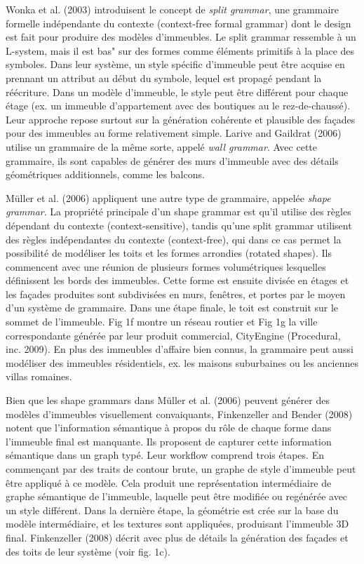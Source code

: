 \documentclass[11pt]{report}
\begin{document}
Wonka et al. (2003) introduisent le concept de \textit{split grammar}, une grammaire formelle indépendante du contexte (context-free formal grammar) dont le design est fait pour produire des modèles d'immeubles. Le split grammar ressemble à un L-system, mais il est bas" sur des formes comme éléments primitifs à la place des symboles. Dans leur système, un style spécific d'immeuble peut être acquise en prennant un attribut au début du symbole, lequel est propagé pendant la réécriture. Dans un modèle d'immeuble, le style peut être différent pour chaque étage (ex. un immeuble d'appartement avec des boutiques au le rez-de-chaussé). Leur approche repose surtout sur la génération cohérente et plausible des façades pour des immeubles au forme relativement simple. Larive and Gaildrat (2006) utilise un grammaire de la même sorte, appelé \textit{wall grammar}. Avec cette grammaire, ils sont capables de générer des murs d'immeuble avec des détails géométriques additionnels, comme les balcons. \newline

Müller et al. (2006) appliquent une autre type de grammaire, appelée \textit{shape grammar}. La propriété principale d'un shape grammar est qu'il utilise des règles dépendant du contexte (context-sensitive), tandis qu'une split grammar utilisent des règles indépendantes du contexte (context-free), qui dans ce cas permet la possibilité de modéliser les toits et les formes arrondies (rotated shapes). Ils commencent avec une réunion de plusieurs formes volumétriques lesquelles définissent les bords des immeubles. Cette forme est ensuite divisée en étages et les façades produites sont subdivisées en murs, fenêtres, et portes par le moyen d'un système de grammaire. Dans une étape finale, le toit est construit sur le sommet de l'immeuble. Fig 1f montre un réseau routier et Fig 1g la ville correspondante générée par leur produit commercial, CityEngine (Procedural, inc. 2009). En plus des immeubles d'affaire bien connus, la grammaire peut aussi modéliser des immeubles résidentiels, ex. les maisons suburbaines ou les anciennes villas romaines. \newline

Bien que les shape grammars dans Müller et al. (2006) peuvent générer des modèles d'immeubles visuellement convaiquants, Finkenzeller and Bender (2008) notent que l'information sémantique à propos du rôle de chaque forme dans l'immeuble final est manquante. Ils proposent de capturer cette information sémantique dans un graph typé. Leur workflow comprend trois étapes. En commençant par des traits de contour brute, un graphe de style d'immeuble peut être appliqué à ce modèle. Cela produit une représentation intermédiaire de graphe sémantique de l'immeuble, laquelle peut être modifiée ou regénérée avec un style différent. Dans la dernière étape, la géométrie est crée sur la base du modèle intermédiaire, et les textures sont appliquées, produisant l'immeuble 3D final. Finkenzeller (2008) décrit avec plus de détails la génération des façades et des toits de leur système (voir fig. 1c). \newline
\end{document}
